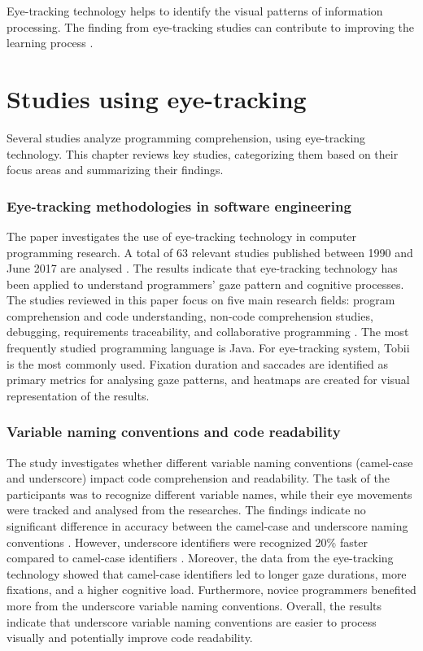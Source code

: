 Eye-tracking technology helps to identify the visual patterns of information processing. 
The finding from eye-tracking studies can contribute to improving the learning process \cite{andrzejewska2020development}.




\section{Studies using eye-tracking}

Several studies analyze programming comprehension, using eye-tracking technology. This chapter reviews key studies, categorizing them based on their focus areas and summarizing their findings.

\subsubsection{Eye-tracking methodologies in software engineering}
The paper \citet{obaidellah2018survey} investigates the use of eye-tracking technology in computer programming research. A total of 63 relevant studies published between 1990 and June 2017 are analysed \citet{obaidellah2018survey}. The results indicate that eye-tracking technology has been applied to understand programmers' gaze pattern and cognitive processes. The studies reviewed in this paper focus on five main research fields: program comprehension and code understanding, non-code comprehension studies, debugging, requirements traceability, and collaborative programming \citet{obaidellah2018survey}.  The most frequently studied programming language is Java.  
For eye-tracking system, Tobii is the most commonly used.  Fixation duration and saccades are identified as primary metrics for analysing gaze patterns, and heatmaps are created for visual representation of the results.


\subsubsection{Variable naming conventions and code readability}

The study \citet{sharif2010eye}investigates whether different variable naming conventions (camel-case and underscore) impact code comprehension and readability.
The task of the participants was to recognize different variable names, while their eye movements were tracked and analysed from the researches. 
The findings indicate no significant difference in accuracy between the camel-case and underscore naming conventions \citet{sharif2010eye}. However, underscore identifiers were recognized 20\% faster compared to camel-case identifiers \citet{sharif2010eye}. Moreover, the data from the eye-tracking technology showed that camel-case identifiers led to longer gaze durations, more fixations, and a   higher cognitive load. Furthermore, novice programmers benefited more from the underscore variable naming conventions.   
Overall, the results indicate that underscore variable naming conventions are easier to process visually and potentially improve code readability.   


